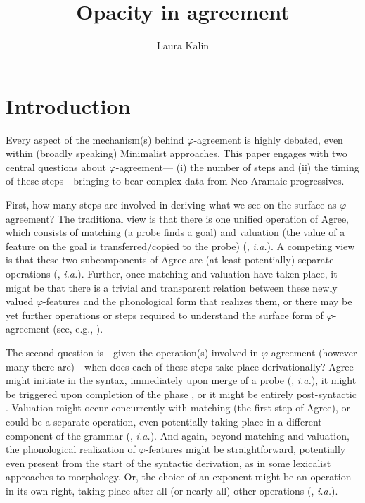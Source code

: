 \documentclass[output=paper
,modfonts
,nonflat]{langsci/langscibook}
\title{Opacity in agreement}
\author{Laura Kalin\affiliation{Princeton University}}
\begin{document}
\maketitle
\section{Introduction} 

Every aspect of the mechanism(s) behind $\varphi$-agreement is highly debated, even within (broadly speaking) Minimalist approaches. This paper engages with two central questions about $\varphi$-agreement--- (i) the number of steps and (ii) the timing of these steps---bringing to bear complex data from Neo-Aramaic progressives.

First, how many steps are involved in deriving what we see on the surface as $\varphi$-agreement? The traditional view is that there is one unified operation of Agree, which consists of matching (a probe finds a goal) and valuation (the value of a feature on the goal is transferred/copied to the probe) (\citealt{Chomsky00,Chomsky01,Bejar03,Preminger11,Preminger14}, \textit{i.a.}). A competing view is that these two subcomponents of Agree are (at least potentially) separate operations (\citealt{vanKoppen07,BBP09,ArregiNevins12,BhattWalkow13,Bonet13,Marusicetal15, Smith17, AtlamazBakerTA}, \textit{i.a.}). Further, once matching and valuation have taken place, it might be that there is a trivial and transparent relation between these newly valued $\varphi$-features and the phonological form that realizes them, or there may be yet further operations or steps required to understand the surface form of $\varphi$-agreement (see, e.g., \citealt{ArregiNevins12}).

The second question is---given the operation(s) involved in $\varphi$-agreement (however many there are)---when does each of these steps take place derivationally? Agree might initiate in the syntax, immediately upon merge of a probe ({\citealt{Bejar03,Preminger11,Preminger14}, \textit{i.a.}}), it might be triggered upon completion of the phase \citep{Chomsky08}, or it might be entirely post-syntactic \citep{Bobaljik08}. Valuation might occur concurrently with matching (the first step of Agree), or could be a separate operation, even potentially taking place in a different component of the grammar (\citealt{vanKoppen07,BBP09,ArregiNevins12,BhattWalkow13,Bonet13,Marusicetal15,Smith17,AtlamazBakerTA}, \textit{i.a.}). And again, beyond matching and valuation, the phonological realization of $\varphi$-features  might be straightforward, potentially even present from the start of the syntactic derivation, as in some lexicalist approaches to morphology. Or, the choice of an exponent might be an operation in its own right,  taking place after all (or nearly all) other operations  (\citealt{HalleMarantz93,HalleMarantz94,EmbickNoyer07}, \textit{i.a.}). 
\end{document}
